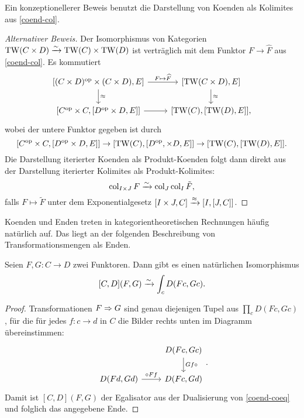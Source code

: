  Ein konzeptionellerer Beweis benutzt die Darstellung von Koenden als
 Kolimites aus \ref{coend-col}.
\begin{proof}[Alternativer Beweis]
  Der Isomorphismus von Kategorien $\operatorname{TW}(C \times D) \xrightarrow[]{\sim} \operatorname{TW}(C) \times
  \operatorname{TW}(D)$ ist verträglich mit dem Funktor $F \to \widehat{F}$ aus
  \ref{coend-col}. Es kommutiert
  \[ \begin{tikzcd}
    {[(C \times D)\op \times (C \times D), E]}
    \arrow{d}{\approx} \arrow{r}{F \mapsto \widehat{F}}
    & {[\TW(C \times D), E]} \arrow{d}{\approx} \\
    {[C\op \times C, [D\op \times D, E]]} \arrow{r}
    & {[\TW(C), [\TW(D), E]]},
  \end{tikzcd}
  \]
  wobei der untere Funktor gegeben ist durch
  \[ [C^\mathrm{op} \times C, [D^\mathrm{op} \times D, E]]
  \to [\operatorname{TW}(C), [D^\mathrm{op}, \times D, E]] \to [\operatorname{TW}(C), [\operatorname{TW}(D), E]].
  \]
  Die Darstellung iterierter Koenden als Produkt-Koenden folgt dann
  direkt aus der Darstellung iterierter Kolimites als
  Produkt-Kolimites:
  \[ \operatorname{col}_{I \times J} F \xrightarrow[]{\sim} \operatorname{col}_J \operatorname{col}_I \tilde{F}, \]
  falls $F \mapsto \tilde{F}$ unter dem Exponentialgesetz $[I \times
    J, C] \xrightarrow{\approx} {[I, [J, C]]}$.
\end{proof}

Koenden und Enden treten in kategorientheoretischen Rechnungen häufig
natürlich auf. Das liegt an der folgenden Beschreibung von
Transformationsmengen als Enden.
\begin{lemma}
  \label{trans-end}
  Seien $F, G: C \to D$ zwei Funktoren. Dann gibt es einen natürlichen
  Isomorphismus
  \[ [C, D](F, G) \xrightarrow[]{\sim} \int_c D(Fc, Gc). \]
\end{lemma}
\begin{proof}
  Transformationen $F \Rightarrow G$ sind genau diejenigen Tupel aus
  $\prod_c D(Fc, Gc)$, für die für jedes $f: c \to d$ in $C$ die
  Bilder rechts unten im Diagramm übereinstimmen:
  \[ \begin{tikzcd}
    & D(Fc, Gc) \arrow{d}{Gf \circ} \\
    D(Fd, Gd) \arrow{r}{\circ Ff} & D(Fc, Gd)
  \end{tikzcd}. \]
  Damit ist $[C, D](F, G)$ der Egalisator aus der Dualisierung von
  \ref{coend-coeq} und folglich das angegebene Ende.
\end{proof}

